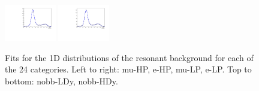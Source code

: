\begin{figure}[htbp]
  \includegraphics[width=0.2\textwidth]{fig/2Dfit/LNuJJ_res_MJJ_mu_LP_nobb_HDy.pdf}
  \includegraphics[width=0.2\textwidth]{fig/2Dfit/LNuJJ_res_MJJ_e_LP_nobb_HDy.pdf}\\
  \caption{
    Fits for the 1D \MJ distributions of the resonant background for each of the 24 categories.
    Left to right: mu-HP, e-HP, mu-LP, e-LP.
    Top to bottom: nobb-LDy, nobb-HDy.
  }
  \label{fig:fits_res_MJJ_Run2}
\end{figure}


